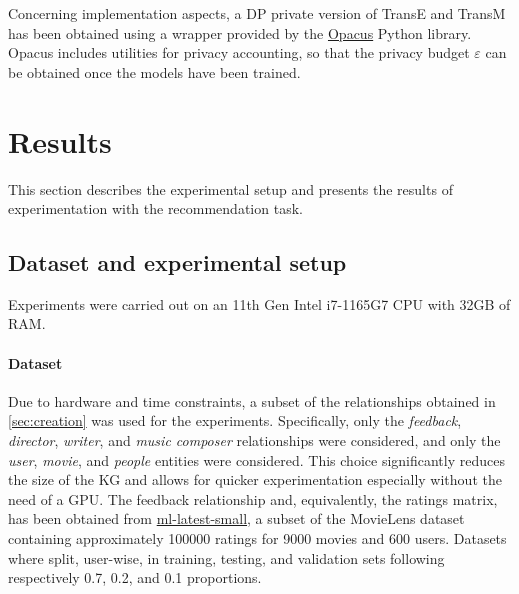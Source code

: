 Concerning implementation aspects, a DP private version of TransE and TransM has been obtained using a wrapper provided by the \href{https://opacus.ai/}{Opacus} Python library.
Opacus includes utilities for privacy accounting, so that the privacy budget $\varepsilon$ can be obtained once the models have been trained.





\section{Results}
This section describes the experimental setup and presents the results of experimentation with the recommendation task.

\subsection{Dataset and experimental setup}

Experiments were carried out on an 11th Gen Intel i7-1165G7 CPU with 32GB of RAM.

\paragraph{Dataset} Due to hardware and time constraints, a subset of the relationships obtained in \cref{sec:creation} was used for the experiments.
Specifically, only the \emph{feedback}, \emph{director}, \emph{writer}, and \emph{music composer} relationships were considered, and only the \emph{user}, \emph{movie}, and \emph{people} entities were considered.
This choice significantly reduces the size of the KG and allows for quicker experimentation especially without the need of a GPU.
The feedback relationship and, equivalently, the ratings matrix, has been obtained from \href{https://grouplens.org/datasets/movielens/latest/}{ml-latest-small}, a subset of the MovieLens dataset containing approximately \num{100000} ratings for \num{9000} movies and \num{600} users.
Datasets where split, user-wise, in training, testing, and validation sets following respectively \num{0.7}, \num{0.2}, and \num{0.1} proportions.

